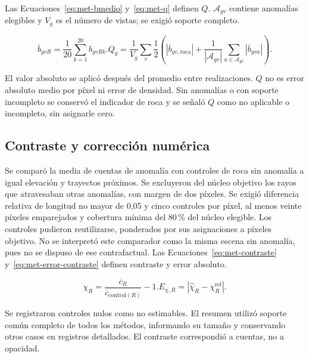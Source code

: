 Las Ecuaciones~\eqref{eq:met-bmedio} y~\eqref{eq:met-q} definen $Q$. $\mathcal A_{gv}$ contiene anomalías elegibles y $V_g$ es el número de vistas; se exigió soporte completo.
\begin{samepage}
\begin{subequations}
\begin{equation}\overline b_{gvR}=\frac1{20}\sum_{k=1}^{20}b_{gvRk}.\label{eq:met-bmedio}\end{equation}
\begin{equation}Q_g=\frac1{V_g}\sum_v\frac12\left(|\overline b_{gv,\mathrm{roca}}|+\frac1{|\mathcal A_{gv}|}\sum_{a\in\mathcal A_{gv}}|\overline b_{gva}|\right).\label{eq:met-q}\end{equation}
\end{subequations}
\end{samepage}
El valor absoluto se aplicó después del promedio entre realizaciones. $Q$ no es error absoluto medio por píxel ni error de densidad. Sin anomalías o con soporte incompleto se conservó el indicador de roca y se señaló $Q$ como no aplicable o incompleto, sin asignarle cero.

\subsection{Contraste y corrección numérica}
Se comparó la media de cuentas de anomalía con controles de roca sin anomalía a igual elevación y trayectos próximos. Se excluyeron del núcleo objetivo los rayos que atravesaban otras anomalías, con margen de dos píxeles. Se exigió diferencia relativa de longitud no mayor de 0,05 y cinco controles por píxel, al menos veinte píxeles emparejados y cobertura mínima del 80\,\% del núcleo elegible. Los controles pudieron reutilizarse, ponderados por sus asignaciones a píxeles objetivo. No se interpretó este comparador como la misma escena sin anomalía, pues no se dispuso de ese contrafactual. Las Ecuaciones~\eqref{eq:met-contraste} y~\eqref{eq:met-error-contraste} definen contraste y error absoluto.
\begin{samepage}
\begin{subequations}
\begin{equation}\chi_R=\frac{\overline c_R}{\overline c_{\mathrm{control}(R)}}-1.\label{eq:met-contraste}\end{equation}
\begin{equation}E_{\chi,R}=|\widehat\chi_R-\chi_R^{\mathrm{ref}}|.\label{eq:met-error-contraste}\end{equation}
\end{subequations}
\end{samepage}
Se registraron controles nulos como no estimables. El resumen utilizó soporte común completo de todos los métodos, informando su tamaño y conservando otros casos en registros detallados. El contraste correspondió a cuentas, no a opacidad.

